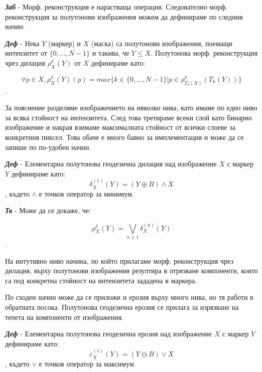\documentclass[fleqn,12pt]{article}
\begin{document}
\bigbreak \textbf{\textit{Заб}} - Морф. реконструкция е нарастваща операция. Следователно морф. реконструкция за полутонови изображения можем да дефинираме по следния начин:

\bigbreak

\textbf{\textit{Деф}} - Нека $Y$ (маркер) и $X$ (маска) са полутонови изображения, поемащи интензитет от $\{0, \dots, N-1\}$ и такива, че $Y \leq X$. Полутонова морф. реконструкция чрез дилация $\rho_X^\delta (Y)$ от $X$ дефинираме като:

$$\forall p \in X, \rho_X^\delta (Y)(p) = max\{k \in \{0, \dots, N-1\} | p \in \rho_{T_k(X)}^\delta (T_k(Y))\}$$.

\bigbreak

За пояснение разделяме изображението на няколко нива, като имаме по едно ниво за всяка стойност на интензитета. След това третираме всеки слой като бинарно изображение и накрая взимаме максималната стойност от всички слоеве за конкретния пиксел. Това обаче е много бавно за имплементация и може да се запише по по-удобен начин.

\bigbreak

\textbf{\textit{Деф}} - Елементарна полутонова геодезична дилация над изображение $X$ с маркер $Y$ дефинираме като:
$$\delta_X^{(1)} (Y) = (Y \oplus B) \land X$$, където $\land$ е точков оператор за минимум.

\bigbreak

\textbf{\textit{Тв}} - Може да се докаже, че:

$$ \rho_X^\delta (Y) = \bigvee\limits_{n \geq 1} \delta_X^{(n)} (Y)$$.

\bigbreak

На интутивно ниво начина, по който прилагаме морф. реконструкция чрез дилация, върху полутонови изображения резултира в отрязване компоненти, които са под конкретна стойност на интензитета зададена в маркера.

\bigbreak

По сходен начин може да се приложи и ерозия върху много нива, но тя работи в обратната посока. Полутонова геодезична ерозия се прилага за изрязване на тепета на компоненти от изображения.

\bigbreak

\textbf{\textit{Деф}} - Елементарна полутонова геодезична ерозия над изображение $X$ с маркер $Y$ дефинираме като:
$$\varepsilon_X^{(1)} (Y) = (Y \ominus B) \lor X$$, където $\lor$ е точков оператор за максимум.

\bigbreak
\end{document}
